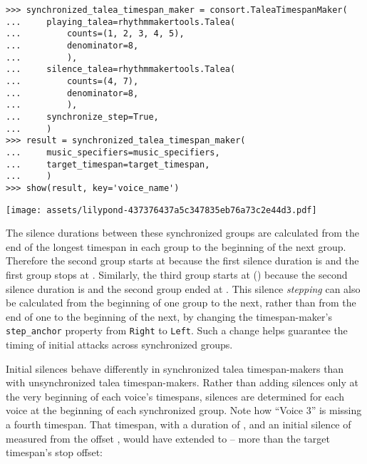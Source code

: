 \begin{abjadbookoutput}
\begin{singlespacing}
\vspace{-0.5\baselineskip}
\begin{verbatim}
>>> synchronized_talea_timespan_maker = consort.TaleaTimespanMaker(
...     playing_talea=rhythmmakertools.Talea(
...         counts=(1, 2, 3, 4, 5),
...         denominator=8,
...         ),
...     silence_talea=rhythmmakertools.Talea(
...         counts=(4, 7),
...         denominator=8,
...         ),
...     synchronize_step=True,
...     )
>>> result = synchronized_talea_timespan_maker(
...     music_specifiers=music_specifiers,
...     target_timespan=target_timespan,
...     )
>>> show(result, key='voice_name')
\end{verbatim}
\noindent\texttt{[image: assets/lilypond-437376437a5c347835eb76a73c2e44d3.pdf]}
\end{singlespacing}
\end{abjadbookoutput}

\noindent The silence durations between these synchronized groups are
calculated from the end of the longest timespan in each group to the beginning
of the next group. Therefore the second group starts at  because
the first silence duration is  and the first group stops at
. Similarly, the third group starts at  ()
because the second silence duration is  and the second group ended
at . This silence \emph{stepping} can also be calculated from the
beginning of one group to the next, rather than from the end of one to the
beginning of the next, by changing the timespan-maker's \texttt{step\_anchor}
property from \texttt{Right} to \texttt{Left}. Such a change helps guarantee
the timing of initial attacks across synchronized groups.

Initial silences behave differently in synchronized talea timespan-makers than
with unsynchronized talea timespan-makers. Rather than adding silences only at
the very beginning of each voice's timespans, silences are determined for each
voice at the beginning of each synchronized group. Note how \enquote{Voice 3}
is missing a fourth timespan. That timespan, with a duration of ,
and an initial silence of  measured from the offset ,
would have extended to  --  more than the target
timespan's  stop offset:

